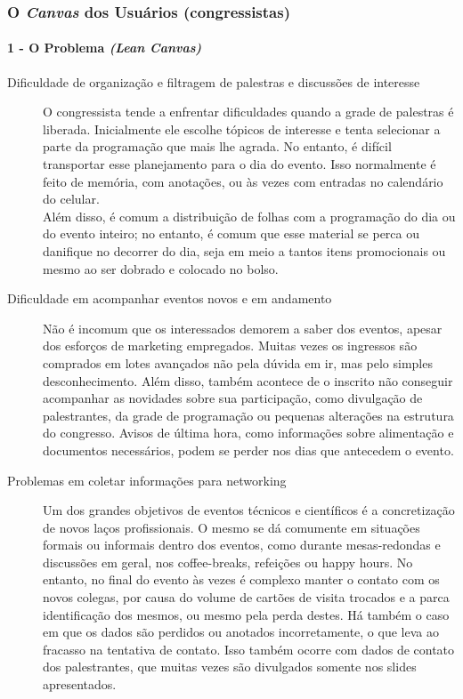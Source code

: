 \documentclass[12pt,a4paper,twoside,hyphens,english,brazil]{abntex2}
\newcommand{\hip}{{\color{BlueViolet}\framebox[1.1\width]{HIP}}}
\begin{document}
\subsubsection*{O \emph{Canvas} dos Usuários (congressistas)}

\paragraph*{1 - O Problema \emph{(Lean Canvas)}}
\begin{description}
\item[\hip{} Dificuldade de organização e filtragem de palestras e discussões de interesse] 
O congressista tende a enfrentar dificuldades quando a grade de palestras é liberada. Inicialmente ele escolhe tópicos de interesse e tenta selecionar a parte da programação que mais lhe agrada. No entanto, é difícil transportar esse planejamento para o dia do evento. Isso normalmente é feito de memória, com anotações, ou às vezes com entradas no calendário do celular.\\
Além disso, é comum a distribuição de folhas com a programação do dia ou do evento inteiro; no entanto, é comum que esse material se perca ou danifique no decorrer do dia, seja em meio a tantos itens promocionais ou mesmo ao ser dobrado e colocado no bolso.

\item[\hip{} Dificuldade em acompanhar eventos novos e em andamento]
Não é incomum que os interessados demorem a saber dos eventos, apesar dos esforços de marketing empregados. Muitas vezes os ingressos são comprados em lotes avançados não pela dúvida em ir, mas pelo simples desconhecimento. Além disso, também acontece de o inscrito não conseguir acompanhar as novidades sobre sua participação, como divulgação de palestrantes, da grade de programação ou pequenas alterações na estrutura do congresso. Avisos de última hora, como informações sobre alimentação e documentos necessários, podem se perder nos dias que antecedem o evento.

\item[\hip{} Problemas em coletar informações para networking]
Um dos grandes objetivos de eventos técnicos e científicos é a concretização de novos laços profissionais. O mesmo se dá comumente em situações formais ou informais dentro dos eventos, como durante mesas-redondas e discussões em geral, nos coffee-breaks, refeições ou happy hours. No entanto, no final do evento às vezes é complexo manter o contato com os novos colegas, por causa do volume de cartões de visita trocados e a parca identificação dos mesmos, ou mesmo pela perda destes. Há também o caso em que os dados são perdidos ou anotados incorretamente, o que leva ao fracasso na tentativa de contato. Isso também ocorre com dados de contato dos palestrantes, que muitas vezes são divulgados somente nos slides apresentados.


\end{description}
\end{document}
